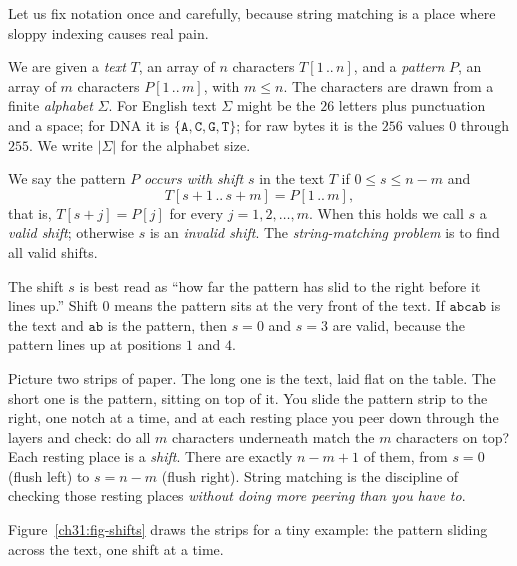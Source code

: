 Let us fix notation once and carefully, because string matching is a place where
sloppy indexing causes real pain.

We are given a \emph{text} $T$, an array of $n$ characters $T[1\,..\,n]$, and a
\emph{pattern} $P$, an array of $m$ characters $P[1\,..\,m]$, with $m \le n$.
The characters are drawn from a finite \emph{alphabet} $\Sigma$. For English
text $\Sigma$ might be the $26$ letters plus punctuation and a space; for DNA it
is $\{\texttt{A},\texttt{C},\texttt{G},\texttt{T}\}$; for raw bytes it is
the $256$ values $0$ through $255$. We write $|\Sigma|$ for the alphabet size.

\begin{definition}
\label{ch31:def-shift}
We say the pattern $P$ \emph{occurs with shift} $s$ in the text $T$ if
$0 \le s \le n - m$ and
\[
  T[s+1\,..\,s+m] = P[1\,..\,m],
\]
that is, $T[s+j] = P[j]$ for every $j = 1, 2, \ldots, m$. When this holds we
call $s$ a \emph{valid shift}; otherwise $s$ is an \emph{invalid shift}. The
\emph{string-matching problem} is to find all valid shifts.
\end{definition}

The shift $s$ is best read as ``how far the pattern has slid to the right before
it lines up.'' Shift $0$ means the pattern sits at the very front of the text. If
$\texttt{abcab}$ is the text and $\texttt{ab}$ is the pattern, then $s=0$ and
$s=3$ are valid, because the pattern lines up at positions $1$ and $4$.

\begin{intuitionbox}
Picture two strips of paper. The long one is the text, laid flat on the table.
The short one is the pattern, sitting on top of it. You slide the pattern strip
to the right, one notch at a time, and at each resting place you peer down
through the layers and check: do all $m$ characters underneath match the $m$
characters on top? Each resting place is a \emph{shift}. There are exactly
$n-m+1$ of them, from $s=0$ (flush left) to $s=n-m$ (flush right). String
matching is the discipline of checking those resting places \emph{without doing
more peering than you have to}.
\end{intuitionbox}

Figure~\ref{ch31:fig-shifts} draws the strips for a tiny example: the pattern
sliding across the text, one shift at a time.

